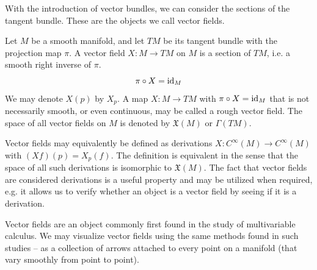 \documentclass[a4paper,12pt]{article}
\begin{document}
With the introduction of vector bundles, we can consider the sections of the tangent bundle.
These are the objects we call vector fields.
\begin{definition}\label{def:vector_field}
   Let $M$ be a smooth manifold, and let $TM$ be its tangent bundle with the projection map $\pi$.
   A vector field $X \colon M \to TM$ on $M$ is a section of $TM$, i.e. a smooth right inverse of $\pi$.
   \begin{equation}
    \pi \circ X = \operatorname{id}_M
   \end{equation}
   We may denote $X(p)$ by $X_p$.
   A map $X \colon M \to TM$ with $\pi \circ X = \operatorname{id}_M$ that is not necessarily smooth, or even continuous, may be called a rough vector field.
   The space of all vector fields on $M$ is denoted by $\mathfrak{X}(M)$ or $\Gamma(TM)$.
\end{definition}
\begin{remark}
    Vector fields may equivalently be defined as derivations $X \colon C^\infty(M) \to C^\infty(M)$ with $(Xf)(p) = X_p(f)$.
    The definition is equivalent in the sense that the space of all such derivations is isomorphic to $\mathfrak{X}(M)$.
    The fact that vector fields are considered derivations is a useful property and may be utilized when required, e.g. it allows us to verify whether an object is a vector field by seeing if it is a derivation.
\end{remark}
Vector fields are an object commonly first found in the study of multivariable calculus.
We may visualize vector fields using the same methods found in such studies -- as a collection of arrows attached to every point on a manifold (that vary smoothly from point to point).
\end{document}
